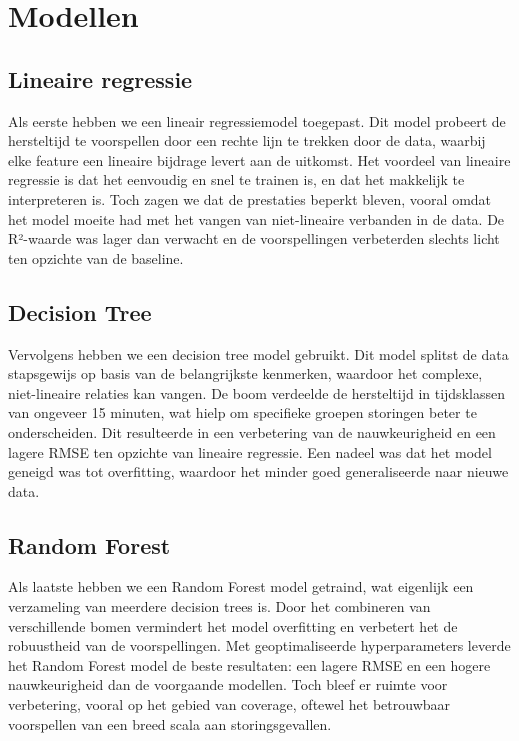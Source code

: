 \documentclass{article}
\begin{document}
\newpage
\section{Modellen}

\subsection{Lineaire regressie}
Als eerste hebben we een lineair regressiemodel toegepast. Dit model probeert de hersteltijd te voorspellen door een rechte lijn te trekken door de data, waarbij elke feature een lineaire bijdrage levert aan de uitkomst. Het voordeel van lineaire regressie is dat het eenvoudig en snel te trainen is, en dat het makkelijk te interpreteren is. Toch zagen we dat de prestaties beperkt bleven, vooral omdat het model moeite had met het vangen van niet-lineaire verbanden in de data. De R²-waarde was lager dan verwacht en de voorspellingen verbeterden slechts licht ten opzichte van de baseline.

\subsection{Decision Tree}
Vervolgens hebben we een decision tree model gebruikt. Dit model splitst de data stapsgewijs op basis van de belangrijkste kenmerken, waardoor het complexe, niet-lineaire relaties kan vangen. De boom verdeelde de hersteltijd in tijdsklassen van ongeveer 15 minuten, wat hielp om specifieke groepen storingen beter te onderscheiden. Dit resulteerde in een verbetering van de nauwkeurigheid en een lagere RMSE ten opzichte van lineaire regressie. Een nadeel was dat het model geneigd was tot overfitting, waardoor het minder goed generaliseerde naar nieuwe data.

\subsection{Random Forest}
Als laatste hebben we een Random Forest model getraind, wat eigenlijk een verzameling van meerdere decision trees is. Door het combineren van verschillende bomen vermindert het model overfitting en verbetert het de robuustheid van de voorspellingen. Met geoptimaliseerde hyperparameters leverde het Random Forest model de beste resultaten: een lagere RMSE en een hogere nauwkeurigheid dan de voorgaande modellen. Toch bleef er ruimte voor verbetering, vooral op het gebied van coverage, oftewel het betrouwbaar voorspellen van een breed scala aan storingsgevallen.
\end{document}
